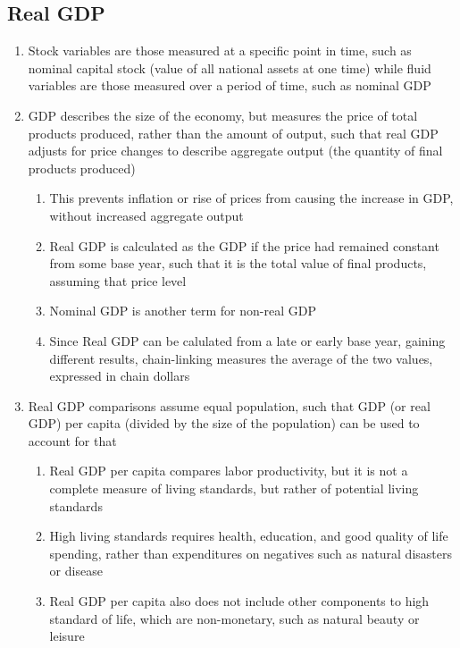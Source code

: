 \documentclass[11 pt, twoside]{article}
\begin{document}
\subsection{Real GDP}
\begin{enumerate}
\item Stock variables are those measured at a specific point in time, such as nominal capital stock (value of all national assets at one time) while fluid variables are those measured over a period of time, such as nominal GDP
\item GDP describes the size of the economy, but measures the price of total products produced, rather than the amount of output, such that real GDP adjusts for price changes to describe aggregate output (the quantity of final products produced)
\begin{enumerate}
\item This prevents inflation or rise of prices from causing the increase in GDP, without increased aggregate output
\item Real GDP is calculated as the GDP if the price had remained constant from some base year, such that it is the total value of final products, assuming that price level
\item Nominal GDP is another term for non-real GDP
\item Since Real GDP can be calulated from a late or early base year, gaining different results, chain-linking measures the average of the two values, expressed in chain dollars
\end{enumerate}
\item Real GDP comparisons assume equal population, such that GDP (or real GDP) per capita (divided by the size of the population) can be used to account for that
\begin{enumerate}
\item Real GDP per capita compares labor productivity, but it is not a complete measure of living standards, but rather of potential living standards
\item High living standards requires health, education, and good quality of life spending, rather than expenditures on negatives such as natural disasters or disease
\item Real GDP per capita also does not include other components to high standard of life, which are non-monetary, such as natural beauty or leisure
\end{enumerate}
\end{enumerate}
\end{document}
